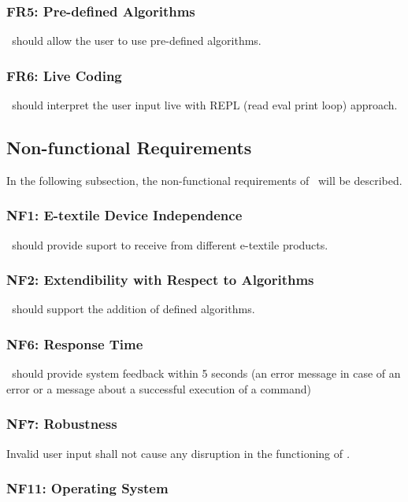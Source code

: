 \subsubsection{FR5: Pre-defined Algorithms}
\textit\ should allow the user to use pre-defined algorithms.

\subsubsection{FR6: Live Coding}
\textit\ should interpret the user input live with REPL (read eval print loop) approach.



\subsection{Non-functional Requirements}

In the following subsection, the non-functional requirements of \textit\ will be described.

\subsubsection{NF1: E-textile Device Independence} 
\textit\ should provide suport to receive from different e-textile products.

\subsubsection{NF2: Extendibility with Respect to Algorithms} 
\textit\ should support the addition of defined algorithms.

\subsubsection{NF6: Response Time}
\textit\ should provide system feedback within 5 seconds (an error message in case of an error or a message about a successful execution of a command)

\subsubsection{NF7: Robustness}
Invalid user input shall not cause any disruption in the functioning of \textit.

\subsubsection{NF11: Operating System}

